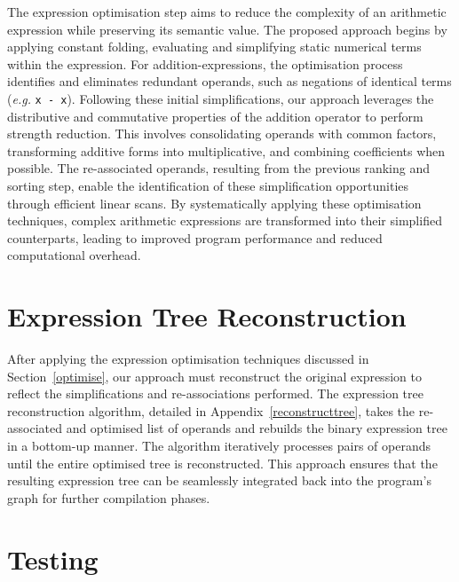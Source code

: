 \documentclass[12pt,openany,a4paper]{book}
\newcommand{\secn}[1] {Section~\ref{#1}}	%
\newcommand{\app}[1]  {Appendix~\ref{#1}}   %
\begin{document}
The expression optimisation step aims to reduce the complexity of an arithmetic
expression while preserving its semantic value. The proposed approach begins
by applying constant folding, evaluating and simplifying static numerical
terms within the expression. For addition-expressions, the optimisation
process identifies and eliminates redundant operands, such as negations of 
identical terms (\emph{e.g.} \verb|x - x|). Following these initial 
simplifications, our approach leverages the distributive and commutative
properties of the addition operator to perform strength reduction. This involves
consolidating operands with common factors, transforming additive forms into
multiplicative, and combining coefficients when possible. The re-associated
operands, resulting from the previous ranking and sorting step, enable the
identification of these simplification opportunities through efficient linear
scans. By systematically applying these optimisation techniques, complex
arithmetic expressions are transformed into their simplified counterparts,
leading to improved program performance and reduced computational overhead.

\section{Expression Tree Reconstruction}
\label{reconstruction}

After applying the expression optimisation techniques discussed in \secn{optimise},
our approach must reconstruct the original expression to reflect the simplifications
and re-associations performed. The expression tree reconstruction algorithm,
detailed in \app{reconstructtree}, takes the re-associated and optimised
list of operands and rebuilds the binary expression tree in a bottom-up
manner. The algorithm iteratively processes pairs of operands until the entire
optimised tree is reconstructed. This approach ensures that the resulting
expression tree can be seamlessly integrated back into the program's
graph for further compilation phases.

\section{Testing}
\label{testingmethod}
\end{document}
